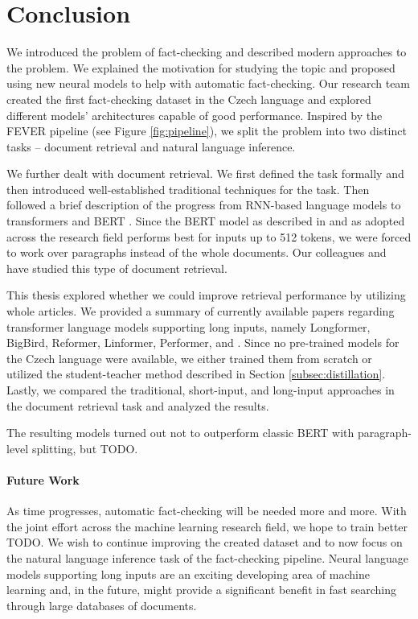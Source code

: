 \chapter*{Conclusion}

We introduced the problem of fact-checking and described modern approaches to the problem.
We explained the motivation for studying the topic and proposed using new neural models to help with automatic fact-checking.
Our research team created the first fact-checking dataset in the Czech language \citep{ullrich} and explored different models' architectures capable of good performance.
Inspired by the FEVER pipeline \citep{fever} (see Figure \ref{fig:pipeline}), we split the problem into two distinct tasks -- document retrieval and natural language inference.

We further dealt with document retrieval.
We first defined the task formally and then introduced well-established traditional techniques for the task.
Then followed a brief description of the progress from RNN-based language models to transformers \citep{attention-is-all-you-need} and BERT \citep{bert}.
Since the BERT model as described in \citep{bert} and as adopted across the research field performs best for inputs up to 512 tokens, we were forced to work over paragraphs instead of the whole documents. 
Our colleagues \citep{rypar} and \citep{dedkova} have studied this type of document retrieval.

This thesis explored whether we could improve retrieval performance by utilizing whole articles. 
We provided a summary of currently available papers regarding transformer language models supporting long inputs, namely Longformer, BigBird, Reformer, Linformer, Performer, and \nystr{}.
Since no pre-trained models for the Czech language were available, we either trained them from scratch or utilized the student-teacher method \citep{student-teacher} described in Section \ref{subsec:distillation}.
Lastly, we compared the traditional, short-input, and long-input approaches in the document retrieval task and analyzed the results.

The resulting models turned out not to outperform classic BERT with paragraph-level splitting, but TODO.

\subsubsection{Future Work}

As time progresses, automatic fact-checking will be needed more and more.
With the joint effort across the machine learning research field, we hope to train better TODO.
We wish to continue improving the created \CTK{} dataset and to now focus on the natural language inference task of the fact-checking pipeline. 
Neural language models supporting long inputs are an exciting developing area of machine learning and, in the future, might provide a significant benefit in fast searching through large databases of documents.
